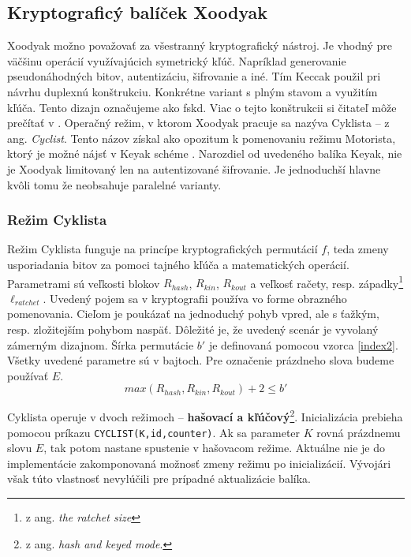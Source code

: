 \subsection{Kryptograficý balíček Xoodyak} 
Xoodyak možno považovať za všestranný kryptografický nástroj. Je vhodný pre väčšinu operácií využívajúcich symetrický kľúč. Napríklad generovanie pseudonáhodných bitov, autentizáciu, šifrovanie a iné. Tím Keccak použil pri návrhu duplexnú konštrukciu. Konkrétne variant s plným stavom a využitím kľúča. Tento dizajn označujeme ako \acrfull{fskd}. Viac o tejto konštrukcii si čitateľ môže prečítať v \cite{duplex}.
Operačný režim, v ktorom Xoodyak pracuje sa nazýva Cyklista -- z ang. \textit{Cyclist}. Tento názov získal ako opozitum k pomenovaniu režimu Motorista, ktorý je možné nájsť v Keyak schéme \cite{keyak}. Narozdiel od uvedeného balíka Keyak, nie je Xoodyak limitovaný len na autentizované šifrovanie. Je jednoduchší hlavne kvôli tomu že neobsahuje paralelné varianty.

\subsubsection{Režim Cyklista}\label{cyklista}
Režim Cyklista funguje na princípe kryptografických permutácií $f$, teda zmeny usporiadania bitov za pomoci tajného kľúča a matematických operácií. Parametrami sú veľkosti blokov $R_{hash}$, $R_{kin}$, $R_{kout}$ a veľkosť račety, resp. západky\footnote{z ang. \textit{the ratchet size}} \cite{ratchet} $\ell_{ratchet}$. Uvedený pojem sa v kryptografii používa vo forme obrazného pomenovania. Cieľom je poukázať na jednoduchý pohyb vpred, ale s ťažkým, resp. zložitejším pohybom naspäť. Dôležité je, že uvedený scenár je vyvolaný zámerným dizajnom. Šírka permutácie $b'$ je definovaná pomocou vzorca \ref{index2}. Všetky uvedené parametre sú v bajtoch. Pre označenie prázdneho slova budeme používať $E$.
\begin{equation}\label{index2}
	max(R_{hash}, R_{kin}, R_{kout}) + 2 \leq b'
\end{equation} 

Cyklista operuje v dvoch režimoch -- \textbf{hašovací a kľúčový}\footnote{z ang. \textit{hash and keyed mode}.}. 
Inicializácia prebieha pomocou príkazu \lstinline|CYCLIST(K,id,counter)|. Ak sa parameter $K$ rovná prázdnemu slovu $E$, tak potom nastane spustenie v hašovacom režime. Aktuálne nie je do implementácie zakomponovaná možnosť zmeny režimu po inicializácií. Vývojári však túto vlastnosť nevylúčili pre prípadné aktualizácie balíka.  


